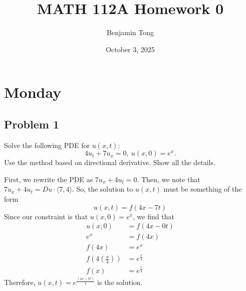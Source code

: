 \documentclass{ben}
\title{MATH 112A Homework 0}
\author{Benjamin Tong}
\date{October 3, 2025}
\begin{document}
\maketitle
\section{Monday}
\subsection{Problem 1}
\noindent
Solve the following PDE for $u(x, t)$:
\[
4u_t + 7u_x = 0,\ u(x, 0) = e^x.
\]
Use the method based on directional derivative. Show all the details.
\begin{solution}
    First, we rewrite the PDE as $7u_x + 4u_t = 0$.
    Then, we note that $7u_x + 4u_t = Du \cdot \langle 7, 4 \rangle$. So, the solution to
    $u(x, t)$ must be something of the form
    \[
        u(x, t) = f(4x - 7t)
    \]
    Since our constraint is that $u(x, 0) = e^x$, we find that
    \begin{align*}
        u(x, 0) &= f(4x - 0t)\\
        e^x &= f(4x)\\
        f(4x) &= e^x\\
        f\left( 4 \left( \frac{x}{4} \right) \right) &= e^{\frac{x}{4}}\\
        f(x) &= e^{\frac{x}{4}}
    \end{align*}
    Therefore, $u(x, t) = e^{\frac{(4x - 7t)}{4}}$ is the solution.
\end{solution}
\end{document}
